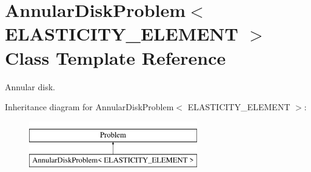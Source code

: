 \hypertarget{classAnnularDiskProblem}{}\section{Annular\+Disk\+Problem$<$ E\+L\+A\+S\+T\+I\+C\+I\+T\+Y\+\_\+\+E\+L\+E\+M\+E\+NT $>$ Class Template Reference}
\label{classAnnularDiskProblem}


Annular disk.  


Inheritance diagram for Annular\+Disk\+Problem$<$ E\+L\+A\+S\+T\+I\+C\+I\+T\+Y\+\_\+\+E\+L\+E\+M\+E\+NT $>$\+:\begin{figure}[H]
\begin{center}
\leavevmode
\includegraphics[height=2.000000cm]{classAnnularDiskProblem}
\end{center}
\end{figure}
